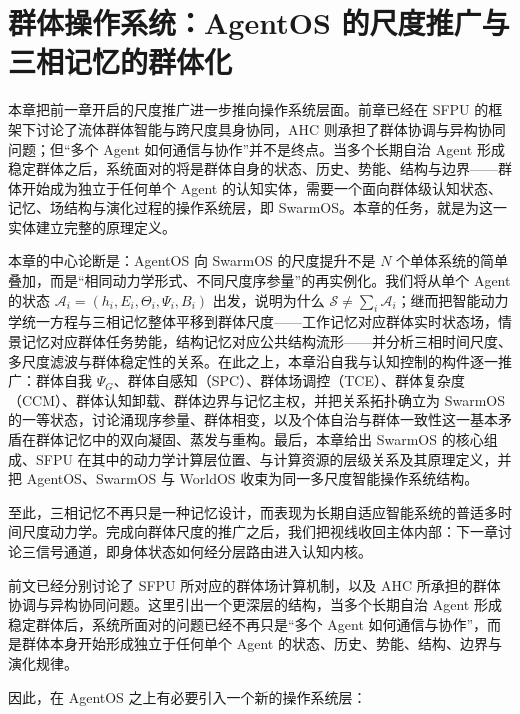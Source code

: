 \chapter{群体操作系统：AgentOS 的尺度推广与三相记忆的群体化}

\begin{chapterlead}
本章把前一章开启的尺度推广进一步推向操作系统层面。前章已经在 SFPU 的框架下讨论了流体群体智能与跨尺度具身协同，AHC 则承担了群体协调与异构协同问题；但``多个 Agent 如何通信与协作''并不是终点。当多个长期自治 Agent 形成稳定群体之后，系统面对的将是群体自身的状态、历史、势能、结构与边界——群体开始成为独立于任何单个 Agent 的认知实体，需要一个面向群体级认知状态、记忆、场结构与演化过程的操作系统层，即 SwarmOS。本章的任务，就是为这一实体建立完整的原理定义。

本章的中心论断是：AgentOS 向 SwarmOS 的尺度提升不是 $N$ 个单体系统的简单叠加，而是``相同动力学形式、不同尺度序参量''的再实例化。我们将从单个 Agent 的状态 $\mathcal{A}_i=(h_i,E_i,\Theta_i,\Psi_i,B_i)$ 出发，说明为什么 $\mathcal{S}\neq\sum_{i}\mathcal{A}_i$；继而把智能动力学统一方程与三相记忆整体平移到群体尺度——工作记忆对应群体实时状态场，情景记忆对应群体任务势能，结构记忆对应公共结构流形——并分析三相时间尺度、多尺度滤波与群体稳定性的关系。在此之上，本章沿自我与认知控制的构件逐一推广：群体自我 $\Psi_G$、群体自感知（SPC）、群体场调控（TCE）、群体复杂度（CCM）、群体认知卸载、群体边界与记忆主权，并把关系拓扑确立为 SwarmOS 的一等状态，讨论涌现序参量、群体相变，以及个体自治与群体一致性这一基本矛盾在群体记忆中的双向凝固、蒸发与重构。最后，本章给出 SwarmOS 的核心组成、SFPU 在其中的动力学计算层位置、与计算资源的层级关系及其原理定义，并把 AgentOS、SwarmOS 与 WorldOS 收束为同一多尺度智能操作系统结构。

至此，三相记忆不再只是一种记忆设计，而表现为长期自适应智能系统的普适多时间尺度动力学。完成向群体尺度的推广之后，我们把视线收回主体内部：下一章讨论三信号通道，即身体状态如何经分层路由进入认知内核。
\end{chapterlead}

前文已经分别讨论了 SFPU 所对应的群体场计算机制，以及 AHC 所承担的群体协调与异构协同问题。这里引出一个更深层的结构，当多个长期自治 Agent 形成稳定群体后，系统所面对的问题已经不再只是``多个 Agent 如何通信与协作''，而是群体本身开始形成独立于任何单个 Agent 的状态、历史、势能、结构、边界与演化规律。

因此，在 AgentOS 之上有必要引入一个新的操作系统层：

\begin{statementbox}
\centering
{}
\end{statementbox}

